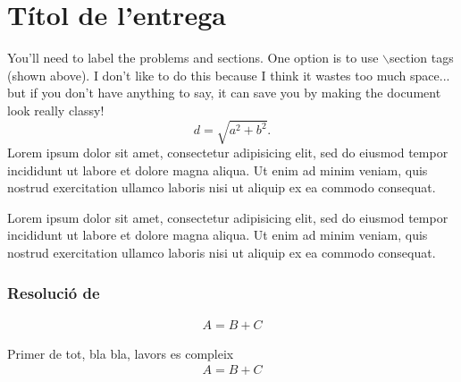 \setcounter{section}{0}
\setcounter{page}{1}
\section{Títol de l'entrega} %
You'll need to label the problems and sections.  One option is to use $\backslash$section tags (shown above).  I don't like to do this because I think it wastes too much space... but if you don't have anything to say, it can save you by making the document look really classy!
\begin{equation}
d = \sqrt{a^2+b^2}.
\end{equation}
Lorem ipsum dolor sit amet, consectetur adipisicing elit, sed do eiusmod tempor incididunt ut labore et dolore magna aliqua. Ut enim ad minim veniam, quis nostrud exercitation ullamco laboris nisi ut aliquip ex ea commodo consequat.

Lorem ipsum dolor sit amet, consectetur adipisicing elit, sed do eiusmod tempor incididunt ut labore et dolore magna aliqua. Ut enim ad minim veniam, quis nostrud exercitation ullamco laboris nisi ut aliquip ex ea commodo consequat.

\subsubsection*{Resolució de }
\begin{align*}
	\boxed{ A = B + C }
\end{align*}
\begin{sproof}
	Primer de tot, bla bla, lavors es compleix
	\begin{align}\label{eq:dore3}
		A = B + C
	\end{align}
\end{sproof}

